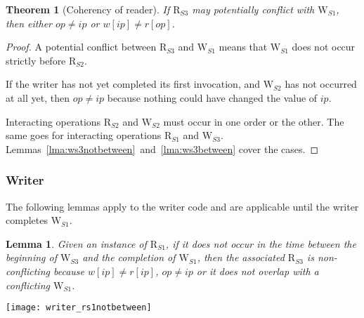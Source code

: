 \documentclass{article}
\newtheorem{thm}{Theorem}
\newtheorem{lemma}{Lemma}
\newcommand\RS[1]{\ensuremath{\text{R}_{S#1}}}
\newcommand\WS[1]{\ensuremath{\text{W}_{S#1}}}
\newcommand\W[1]{\ensuremath{w\left[#1\right]}}
\newcommand\R[1]{\ensuremath{r\left[#1\right]}}
\newcommand\ip{\ensuremath{ip}}
\newcommand\op{\ensuremath{op}}
\begin{document}
\begin{thm}[Coherency of reader]\label{thm:rcoh}
  If \RS3 may potentially conflict with \WS1, then either $\op\neq\ip$ or $\W{\ip}\neq\R{\op}$.
\end{thm}
\begin{proof}
  A potential conflict between \RS3 and \WS1 means that \WS1 does not occur strictly before \RS2.

  If the writer has not yet completed its first invocation, and \WS2 has
  not occurred at all yet, then $\op\neq\ip$ because nothing could have
  changed the value of $\ip$.

  Interacting operations \RS2 and \WS2 must occur in one order or the
  other. The same goes for interacting operations \RS1 and \WS3.
  Lemmas~\ref{lma:ws3notbetween}~and~\ref{lma:ws3between} cover the
  cases.




\end{proof}

\subsubsection{Writer}

The following lemmas apply to the writer code and are applicable until
the writer completes \WS1.

\begin{lemma}\label{lma:rs1notbetween}
  Given an instance of \RS1, if it does not occur in the time between
  the beginning of \WS3 and the completion of \WS1, then the
  associated \RS3 is non-conflicting because $\W{\ip}\neq\R{\ip}$,
  $\op\neq\ip$ or it does not overlap with a conflicting \WS1.
\end{lemma}

\begin{figure*}[h]
  \centering
  \texttt{[image: writer\_rs1notbetween]}
  \caption{\RS1 does not occur between \WS 3 and completion of \WS 1}
  \label{fig:l3i1}
\end{figure*}
\end{document}
